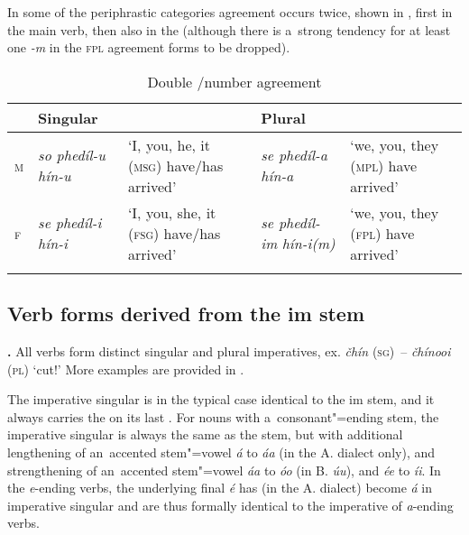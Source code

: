 In some of the periphrastic categories agreement occurs twice, shown in , first in the main verb, then also in the  (although there is a~strong tendency for at least one \textit{-m} in the \textsc{fpl} agreement forms to be dropped).


\begin{table}[ht]
\caption{Double /number agreement}

\begin{tabularx}{\textwidth}{ l P{20mm} Q P{20mm} Q }
\lsptoprule
&
Singular &
&
Plural &
\\\hline
\textsc{m} &
\textit{so phedíl-u hín-u} &
`I, you, he, it (\textsc{msg}) have/has arrived' &
\textit{se phedíl-a hín-a} &
`we, you, they (\textsc{mpl}) have arrived'\\
\textsc{f} &
\textit{se phedíl-i hín-i} &
`I, you, she, it (\textsc{fsg}) have/has arrived' &
\textit{se phedíl-im}
\textit{hín-i(m)} &
`we, you, they (\textsc{fpl}) have arrived'\\\lspbottomrule
\end{tabularx}
\label{tab:8-21}
\end{table}


\subsection{Verb forms derived from the im stem}
\label{subsec:8-4-2}


\textbf{.} All verbs form distinct singular and plural imperatives, ex. \textit{čhín} \textsc{(sg)}~-- \textit{čhínooi} (\textsc{pl}) `cut!' More examples are provided in .



The imperative singular is in the typical case identical to the im stem, and it always carries the  on its last . For nouns with a~consonant"=ending stem, the imperative singular is always the same as the stem, but with additional lengthening of an~accented stem"=vowel \textit{á} to \textit{áa} (in the A. dialect only), and strengthening of an~accented stem"=vowel \textit{áa} to \textit{óo} (in B. \textit{úu}), and \textit{ée} to \textit{íi}. In the \textit{e}-ending verbs, the underlying final \textit{é} has (in the A. dialect) become \textit{á} in imperative singular and are thus formally identical to the imperative of \textit{a}-ending verbs.


